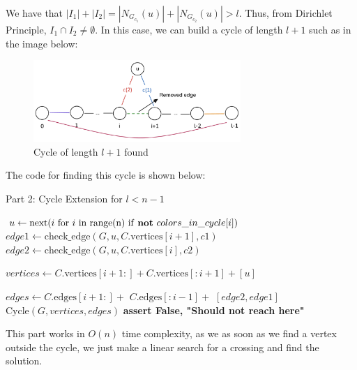 We have that $|I_1| + |I_2| = |N_{G_{c_1}}(u)| + |N_{G_{c_2}}(u)| > l$. Thus, 
from Dirichlet Principle, $I_1 \cap I_2 \neq \emptyset$. In this case, we can build a cycle of length $l + 1$
such as in the image below:

\begin{figure}[H]
    \centering
    \includegraphics[width=0.7\textwidth]{figuras/cycle_cycle_extension.png}
    \caption{Cycle of length \( l + 1 \) found}
    \label{fig:cycle_cycle_extension}
\end{figure}

The code for finding this cycle is shown below:

\begin{algorithm}[H]
    \caption{Part 2: Cycle Extension for \( l < n - 1 \)}
    \begin{algorithmic}
            \State $u \gets \text{next}(i \text{ for } i \text{ in range(n) if \textbf{not} } colors\_in\_cycle[i])$
                \State $edge1 \gets \text{check\_edge}(G, u, C.\text{vertices}[i + 1], c1)$
                \State $edge2 \gets \text{check\_edge}(G, u, C.\text{vertices}[i], c2)$
                
                    \State $vertices \gets C.\text{vertices}[i + 1:] + C.\text{vertices}[:i + 1] + [u]$

                    \State $edges \gets C.\text{edges}[i + 1:] +$
                    \State \hspace{3.3em} $C.\text{edges}[:i - 1] +$
                    \State \hspace{3.3em} $[edge2, edge1]$
                    \State \Return $\text{Cycle}(G, vertices, edges)$
                \EndIf
            \EndFor
            \State \textbf{assert False, "Should not reach here"}
        \EndFunction
    \end{algorithmic}
\end{algorithm}

This part works in $O(n)$ time complexity, as we as soon as we find a vertex outside the cycle,
we just make a linear search for a crossing and find the solution.

